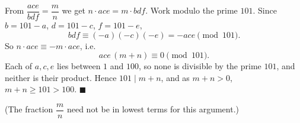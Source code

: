 From $\dfrac{ace}{bdf}=\dfrac {m}{n}$ we get $n\cdot ace=m\cdot bdf$. Work modulo the prime $101$. Since $b=101-a$, $d=101-c$, $f=101-e$,
\[
bdf\equiv(-a)(-c)(-e)=-ace\pmod{101}.
\]
So $n\cdot ace\equiv-m\cdot ace$, i.e.
\[
ace\,(m+n)\equiv0\pmod{101}.
\]
Each of $a,c,e$ lies between $1$ and $100$, so none is divisible by the prime $101$, and neither is their product. Hence $101\mid m+n$, and as $m+n>0$, $m+n\ge101>100$. $\blacksquare$

(The fraction $\dfrac {m}{n}$ need not be in lowest terms for this argument.)
